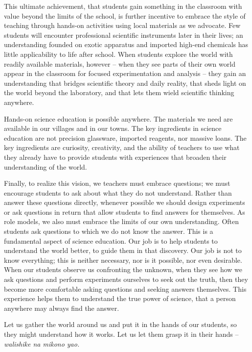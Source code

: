 This ultimate achievement, 
that students gain something in the classroom with 
value beyond the limits of the school, 
is further incentive to embrace the style 
of teaching through hands-on activities using local materials 
as we advocate. 
Few students will encounter professional scientific instruments 
later in their lives; 
an understanding founded on exotic apparatus and 
imported high-end chemicals has little applicability to life after school. 
When students explore the world with readily available materials, 
however – 
when they see parts of their own world appear in the classroom 
for focused experimentation and analysis – 
they gain an understanding that bridges scientific theory and 
daily reality, 
that sheds light on the world beyond the laboratory, 
and that lets them wield scientific thinking anywhere.

Hands-on science education is possible anywhere. 
The materials we need are available in our villages and in our towns. 
The key ingredients in science education are not precision glassware, 
imported reagents, nor massive loans. 
The key ingredients are curiosity, creativity, 
and the ability of teachers to use what they already have 
to provide students with experiences 
that broaden their understanding of the world.

Finally, to realize this vision, 
we teachers must embrace questions; 
we must encourage students to ask about what they do not understand. 
Rather than answer these questions directly, 
whenever possible we should design experiments 
or ask questions in return that allow students 
to find answers for themselves. 
As role models, we also must embrace the limits of our own understanding. 
Often students ask questions to which we do not know the answer. 
This is a fundamental aspect of science education. 
Our job is to help students to understand the world better, 
to guide them in that discovery. 
Our job is not to know everything; this is neither necessary, 
nor is it possible, nor even desirable. 
When our students observe us confronting the unknown, 
when they see how we ask questions and 
perform experiments ourselves to seek out the truth, 
then they become more comfortable asking questions 
and seeking answers themselves. 
This experience helps them to understand the true power of science, 
that a person anywhere may always find the answer.

Let us gather the world around us and 
put it in the hands of our students, 
so they might understand how it works. 
Let us let them grasp it in their hands – 
\textit{walishike na mikono yao.}
